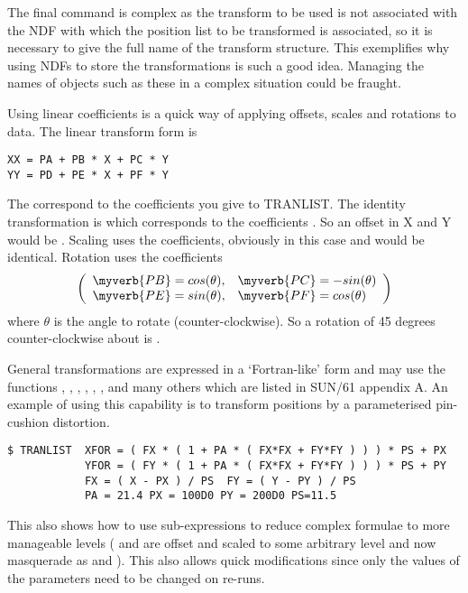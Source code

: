 The final command is complex as the transform to be used is not
associated with the NDF with which the position list to be transformed
is associated, so it is necessary to give the full name of the 
transform structure. This exemplifies why using NDFs to store the
transformations is such a good idea. Managing the names of objects such
as these in a complex situation could be fraught.

Using linear coefficients is a quick way of applying offsets, scales and
rotations to data. The linear transform form is 
\begin{myquote}
\begin{verbatim}
XX = PA + PB * X + PC * Y 
YY = PD + PE * X + PF * Y 
\end{verbatim}
\end{myquote}
The  correspond to the coefficients you give to TRANLIST.
The identity transformation is \myverb{[0,1,0,0,0,1]} which corresponds
to the coefficients \myverb{[PA,PB,PC,PD,PE,PF]}. So an offset in X and
Y would be \myverb{[PA,1,0,PD,0,1]}. Scaling uses the  coefficients, obviously in this case  and
 would be identical. Rotation uses the coefficients
\begin{eqnarray*}
\left(
        \begin{array}{ll} 
           \myverb{PB} = cos(\theta), & \myverb{PC} = -sin(\theta) \\
           \myverb{PE} = sin(\theta), & \myverb{PF} = cos(\theta) \\
        \end{array}
\right)
\end{eqnarray*}
where $\theta$ is the angle to rotate (counter-clockwise). So a rotation
of 45 degrees counter-clockwise about  is
\myverb{[0,0.7071,-0.7071,0,0.7071,0.7071]}.

General transformations are expressed in a `Fortran-like' form and may
use the functions , , , 
, 
, ,  and many others  which are
listed in SUN/61 appendix A. An example of using this capability is to
transform positions by a parameterised pin-cushion distortion.
\begin{myquote}
\begin{verbatim}
$ TRANLIST  XFOR = ( FX * ( 1 + PA * ( FX*FX + FY*FY ) ) ) * PS + PX
            YFOR = ( FY * ( 1 + PA * ( FX*FX + FY*FY ) ) ) * PS + PY
            FX = ( X - PX ) / PS  FY = ( Y - PY ) / PS
            PA = 21.4 PX = 100D0 PY = 200D0 PS=11.5
\end{verbatim}
\end{myquote}
This also shows how to use sub-expressions to reduce complex formulae to
more manageable levels ( and  are offset and scaled
to some arbitrary level and now masquerade as  and
). This also allows quick modifications since only the values
of the parameters need to be changed on re-runs.

